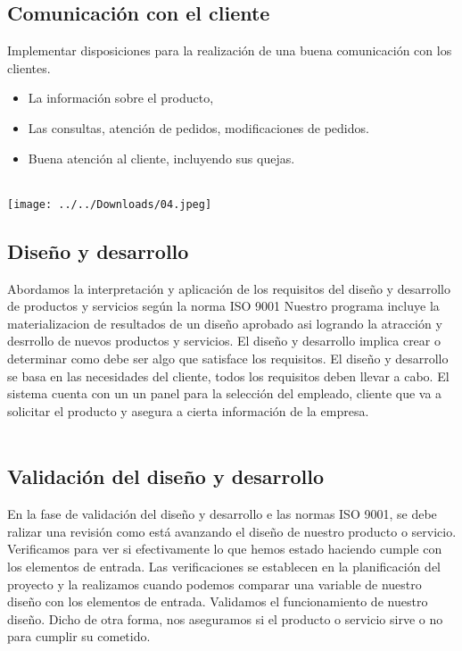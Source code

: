 \documentclass[12pt,a4paper]{article}
\begin{document}
\subsection{Comunicación con el cliente}
Implementar disposiciones para la realización de una buena comunicación con  los clientes.
\begin{itemize}
\item La información sobre el producto,
\item Las consultas, atención de pedidos, modificaciones de pedidos.
\item Buena atención al cliente, incluyendo sus quejas.\\\\
\end{itemize}
\begin{center}
\texttt{[image: ../../Downloads/04.jpeg]} 
\end{center}

\subsection{Diseño y desarrollo}
Abordamos la interpretación y aplicación de los requisitos del diseño y desarrollo de productos y servicios según la norma ISO 9001  
Nuestro programa incluye la materializacion de resultados de un diseño aprobado asi logrando la atracción y desrrollo de nuevos productos y servicios. El diseño y desarrollo implica crear o determinar como debe ser algo que satisface los requisitos. El diseño y desarrollo se basa en las necesidades del cliente, todos los requisitos deben llevar a cabo. El sistema cuenta con un un panel para la selección del empleado, cliente que va a solicitar el producto y asegura a cierta información de la empresa.\\\\

\subsection{Validación del diseño y desarrollo}
En la fase de validación del diseño y desarrollo e las normas ISO 9001, se  debe ralizar una revisión como está avanzando el diseño de nuestro producto o servicio. Verificamos para ver si efectivamente lo que hemos estado haciendo cumple con los elementos de entrada. Las verificaciones se establecen en la planificación del proyecto y la realizamos cuando podemos comparar una variable de nuestro diseño con los elementos de entrada. Validamos el funcionamiento de nuestro diseño. Dicho de otra forma, nos aseguramos si el producto o servicio sirve o no para cumplir su cometido.
\end{document}
